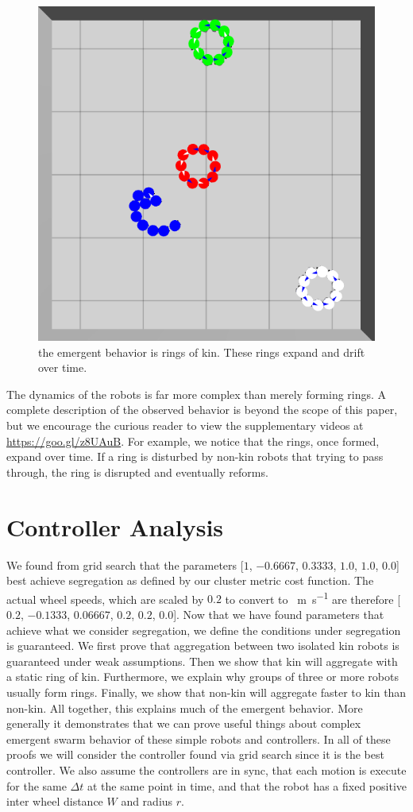 \documentclass[conference]{IEEEtran}
\begin{document}
    \begin{figure}
      \centering
      \includegraphics[width=0.7\linewidth]{./images/rings_example.png}
      \caption{the emergent behavior is rings of kin. These rings expand and drift over time.}
      \label{fig:rings}
    \end{figure}

    The dynamics of the robots is far more complex than merely forming rings. A complete description of the observed behavior is beyond the scope of this paper, but we encourage the curious reader to view the supplementary videos at \href{https://www.youtube.com/playlist?list=PL9HqYJ1IkIKVX9EsT5BY9LnBsBPTjc5bB}{https://goo.gl/z8UAuB}. For example, we notice that the rings, once formed, expand over time. If a ring is disturbed by non-kin robots that trying to pass through, the ring is disrupted and eventually reforms.

\section{Controller Analysis}

  We found from grid search that the parameters [$1$, $-0.6667$, $0.3333$, $1.0$, $1.0$, $0.0$] best achieve segregation as defined by our cluster metric cost function. The actual wheel speeds, which are scaled by $0.2$ to convert to \SI{}{\meter\per\second} are therefore [$0.2$, $-0.1333$, $0.06667$, $0.2$, $0.2$, $0.0$]. Now that we have found parameters that achieve what we consider segregation, we define the conditions under segregation is guaranteed. We first prove that aggregation between two isolated kin robots is guaranteed under weak assumptions. Then we show that kin will aggregate with a static ring of kin. Furthermore, we explain why groups of three or more robots usually form rings. Finally, we show that non-kin will aggregate faster to kin than non-kin. All together, this explains much of the emergent behavior. More generally it demonstrates that we can prove useful things about complex emergent swarm behavior of these simple robots and controllers. In all of these proofs we will consider the controller found via grid search since it is the best controller. We also assume the controllers are in sync, that each motion is execute for the same $\Delta t$ at the same point in time, and that the robot has a fixed positive inter wheel distance $W$ and radius $r$.
\end{document}
